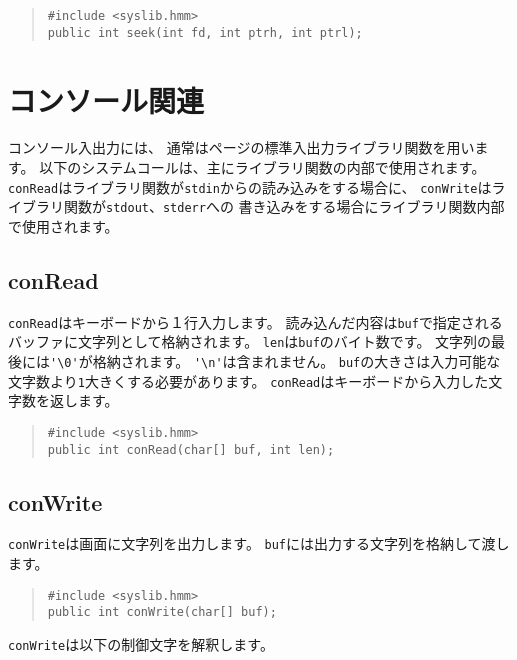 \begin{quote}
\begin{verbatim}
#include <syslib.hmm>
public int seek(int fd, int ptrh, int ptrl);
\end{verbatim}
\end{quote}

\section{コンソール関連}

コンソール入出力には、
通常は\pageref{chap4:stdio}ページの標準入出力ライブラリ関数を用います。
以下のシステムコールは、主にライブラリ関数の内部で使用されます。
\verb/conRead/はライブラリ関数が\verb/stdin/からの読み込みをする場合に、
\verb/conWrite/はライブラリ関数が\verb/stdout/、\verb/stderr/への
書き込みをする場合にライブラリ関数内部で使用されます。

\subsection{conRead}

\verb/conRead/はキーボードから１行入力します。
読み込んだ内容は\verb/buf/で指定されるバッファに文字列として格納されます。
\verb/len/は\verb/buf/のバイト数です。
文字列の最後には\verb/'\0'/が格納されます。
\verb/'\n'/は含まれません。
\verb/buf/の大きさは入力可能な文字数より\verb/1/大きくする必要があります。
\verb/conRead/はキーボードから入力した文字数を返します。

\begin{quote}
\begin{verbatim}
#include <syslib.hmm>
public int conRead(char[] buf, int len);
\end{verbatim}
\end{quote}

\subsection{conWrite}

\verb/conWrite/は画面に文字列を出力します。
\verb/buf/には出力する文字列を格納して渡します。

\begin{quote}
\begin{verbatim}
#include <syslib.hmm>
public int conWrite(char[] buf);
\end{verbatim}
\end{quote}

\verb/conWrite/は以下の制御文字を解釈します。

